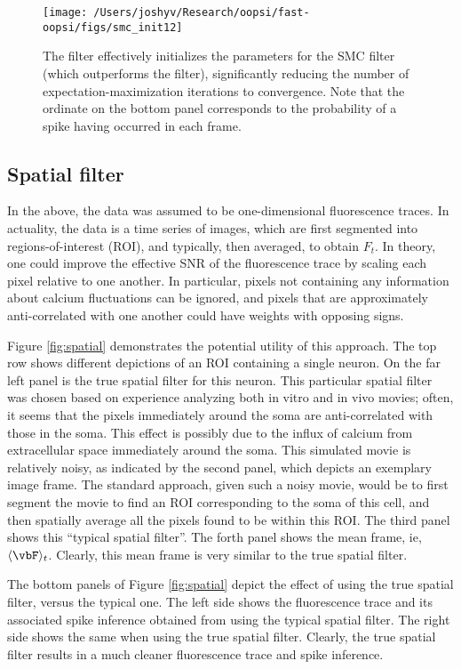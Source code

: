 \begin{figure}[h!]
\centering \texttt{[image: /Users/joshyv/Research/oopsi/fast-oopsi/figs/smc\_init12]}
\caption[\foopsi filter can initialize Wiener filter]{The \foopsi filter effectively initializes the parameters for the SMC filter (which outperforms the \foopsi filter), significantly reducing the number of expectation-maximization iterations to convergence.  Note that the ordinate on the bottom panel corresponds to the probability of a spike having occurred in each frame.} \label{fig:smc_init}
\end{figure}

\subsection{Spatial filter}

In the above, the data was assumed to be one-dimensional fluorescence traces.  In actuality, the data is a time series of images, which are first segmented into regions-of-interest (ROI), and typically, then averaged, to obtain $F_t$.  In theory, one could improve the effective SNR of the fluorescence trace by scaling each pixel relative to one another.  In particular, pixels not containing any information about calcium fluctuations can be ignored, and pixels that are approximately anti-correlated with one another could have weights with opposing signs.  

Figure \ref{fig:spatial} demonstrates the potential utility of this approach.  The top row shows different depictions of an ROI containing a single neuron.  On the far left panel is the true spatial filter for this neuron.  This particular spatial filter was chosen based on experience analyzing both in vitro and in vivo movies; often, it seems that the pixels immediately around the soma are anti-correlated with those in the soma.  This effect is possibly due to the influx of calcium from extracellular space immediately around the soma.  This simulated movie is relatively noisy, as indicated by the second panel, which depicts an exemplary image frame.  The standard approach, given such a noisy movie, would be to first segment the movie to find an ROI corresponding to the soma of this cell, and then spatially average all the pixels found to be within this ROI.  The third panel shows this ``typical spatial filter''.  The forth panel shows the mean frame, ie, $\langle \vbF \rangle_t$.  Clearly, this mean frame is very similar to the true spatial filter.

The bottom panels of Figure \ref{fig:spatial} depict the effect of using the true spatial filter, versus the typical one. The left side shows the fluorescence trace and its associated spike inference obtained from using the typical spatial filter.  The right side shows the same when using the true spatial filter.  Clearly, the true spatial filter results in a much cleaner fluorescence trace and spike inference.  


